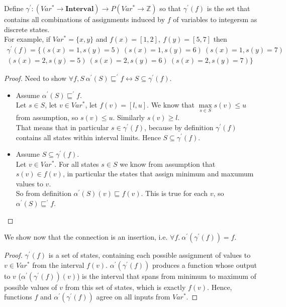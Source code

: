 Define $\gamma^{'}:(Var^*\rightarrow \mathbf{Interval})\rightarrow P(Var^*\rightarrow \mathbb{Z})$ so that $\gamma^{'}(f)$ is the set that contains all combinations of assignments induced by $f$ of variables to integersm as discrete states.\\
For example, if $Var^* = \{x,y\}$ and $f(x)=[1,2],\ f(y)=[5,7]$ then
\begin{align*}
\gamma^{'}(f)=\{(s(x)=1,s(y)=5)\ (s(x)=1,s(y)=6)\ (s(x)=1,s(y)=7)\\ (s(x)=2,s(y)=5)\ (s(x)=2,s(y)=6)\ (s(x)=2,s(y)=7)\}
\end{align*}
\begin{proof}
	Need to show $\forall f,S\ \alpha^{'}(S)\sqsubseteq^{'}f \leftrightarrow S\subseteq \gamma^{'}(f)$.
	\begin{itemize}
	\item Assume $\alpha^{'}(S)\sqsubseteq^{'}f$.\\
	Let $s\in S$, let $v\in Var^*$, let $f(v)=[l,u]$. We know that $\max\limits_{s\in S}s(v)\leq u$ from assumption, so $s(v)\leq u$. Similarly $s(v)\geq l$.\\
	That means that in particular $s\in \gamma^{'}(f)$, because by definition $\gamma^{'}(f)$ contains all states within interval limits. Hence $S\subseteq \gamma^{'}(f)$.
	\item Assume $S\subseteq \gamma^{'}(f)$.\\
	Let $v\in Var^*$. For all states $s\in S$ we know from assumption that $s(v)\in f(v)$, in particular the states that assign minimum and maxumum values to $v$.\\
	So from definition $\alpha^{'}(S)(v)\sqsubseteq f(v)$. This is true for each $v$, so $\alpha^{'}(S)\sqsubseteq^{'}f$.
	\end{itemize}
\end{proof}
We show now that the connection is an insertion, i.e. $\forall f.\ \alpha^{'}(\gamma^{'}(f))=f$.
\begin{proof}
	$\gamma^{'}(f)$ is a set of states, containing each possible assignment of values to $v\in Var^*$ from the interval $f(v)$. $\alpha^{'}(\gamma^{'}(f))$ produces a function whose output to $v$ ($\alpha^{'}(\gamma^{'}(f))(v)$) is the interval that spans from minimum to maximum of possible values of $v$ from this set of states, which is exactly $f(v)$. Hence, functions $f$ and $\alpha^{'}(\gamma^{'}(f))$ agree on all inputs from $Var^*$.
\end{proof}
